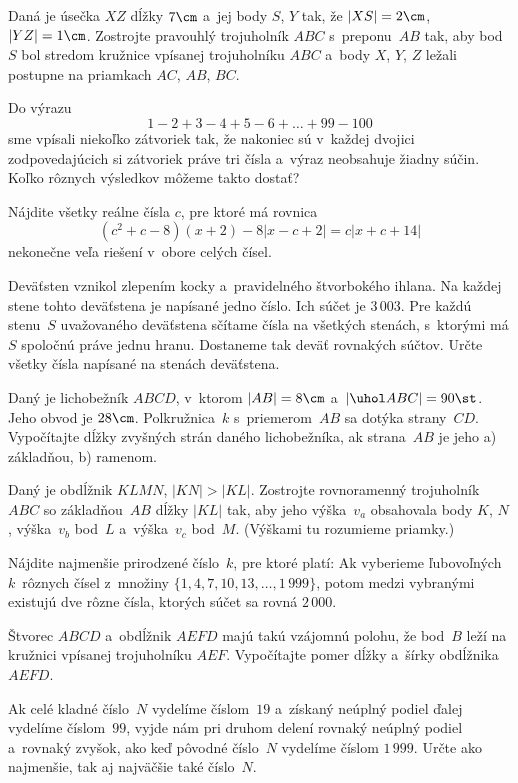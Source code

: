 {%
Daná je úsečka $XZ$ dĺžky $7\cm$ a~jej body $S$, $Y$ tak, že
$|XS|=2\cm$, $|YZ|=1\cm$. Zostrojte pravouhlý trojuholník $ABC$
s~preponu~$AB$ tak, aby bod~$S$ bol stredom kružnice vpísanej trojuholníku
$ABC$ a~body $X$, $Y$, $Z$ ležali postupne na priamkach $AC$, $AB$,
$BC$.}

{%
Do výrazu
$$
1-2+3-4+5-6+\dots+99-100
$$
sme vpísali niekoľko zátvoriek tak, že nakoniec sú v~každej dvojici
zodpovedajúcich si zátvoriek práve tri čísla a~výraz neobsahuje žiadny
súčin. Koľko rôznych výsledkov môžeme takto dostať?}

{%
Nájdite všetky reálne čísla $c$, pre ktoré má rovnica
$$
(c^2+c-8)(x+2)-8|x-c+2|=c|x+c+14|
$$
nekonečne veľa riešení v~obore celých čísel.}

{%
Deväťsten vznikol zlepením kocky a~pravidelného
štvorbokého ihlana. Na každej stene tohto deväťstena je napísané
jedno číslo. Ich súčet je $3\,003$. Pre každú stenu~$S$
uvažovaného deväťstena sčítame čísla na všetkých stenách,
s~ktorými má $S$ spoločnú práve jednu hranu. Dostaneme tak deväť
rovnakých súčtov. Určte všetky čísla napísané na stenách
deväťstena.}

{%
Daný je lichobežník $ABCD$, v~ktorom $|AB|=8\cm$ a~$|\uhol
ABC|=90\st$. Jeho obvod je $28\cm$. Polkružnica~$k$ s~priemerom~$AB$
sa dotýka strany~$CD$. Vypočítajte dĺžky zvyšných strán
daného lichobežníka, ak strana~$AB$ je jeho
\ite a) základňou,
\ite b) ramenom.}

{%
Daný je obdĺžnik $KLMN$, $|KN|>|KL|$. Zostrojte rovnoramenný trojuholník
$ABC$ so základňou~$AB$ dĺžky $|KL|$ tak, aby jeho výška~$v_a$
obsahovala body $K$, $N$, výška~$v_b$ bod~$L$ a~výška~$v_c$ bod~$M$.
(Výškami tu rozumieme priamky.)}

{%
Nájdite najmenšie prirodzené číslo~$k$, pre ktoré platí:
Ak vyberieme ľubovoľných $k$~rôznych čísel z~množiny
$\{1, 4, 7, 10, 13,\dots, 1\,999\}$, potom medzi vybranými existujú
dve rôzne čísla, ktorých súčet sa rovná $2\,000$.}

{%
Štvorec $ABC\!D$ a~obdĺžnik $AEFD$ majú takú vzájomnú
polohu, že bod~$B$ leží na kružnici vpísanej trojuholníku $AEF$.
Vypočítajte pomer dĺžky a~šírky obdĺžnika $AEFD$.}

{%
Ak celé kladné číslo~$N$ vydelíme
číslom~$19$ a~získaný neúplný podiel ďalej vydelíme
číslom~$99$, vyjde nám pri druhom delení rovnaký neúplný
podiel a~rovnaký zvyšok, ako keď pôvodné číslo~$N$ vydelíme
číslom $1\,999$. Určte ako najmenšie, tak aj najväčšie také číslo~$N$.}

